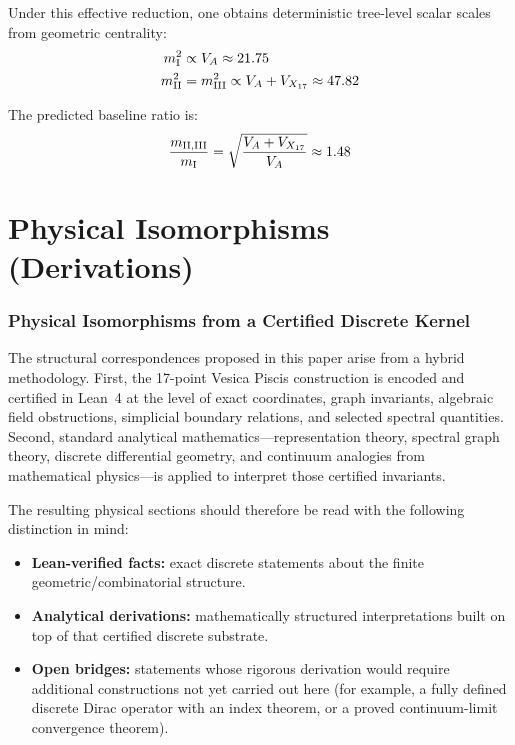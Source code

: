 \documentclass[12pt, a4paper]{article}
\begin{document}
Under this effective reduction, one obtains deterministic tree-level scalar scales from geometric centrality:
\begin{align*}
m_{\rm I}^2 &\propto V_A \approx 21.75 \\
m_{\rm II}^2 &= m_{\rm III}^2 \propto V_A + V_{X_{17}} \approx 47.82
\end{align*}

The predicted baseline ratio is:
\[
\frac{m_{\rm II, III}}{m_{\rm I}} = \sqrt{\frac{V_A + V_{X_{17}}}{V_A}} \approx 1.48
\]
\newpage
\part{Physical Isomorphisms (Derivations)}

\section{Physical Isomorphisms from a Certified Discrete Kernel}\label{sec:physics}

The structural correspondences proposed in this paper arise from a hybrid methodology. First, the 17-point Vesica Piscis construction is encoded and certified in Lean~4 at the level of exact coordinates, graph invariants, algebraic field obstructions, simplicial boundary relations, and selected spectral quantities. Second, standard analytical mathematics---representation theory, spectral graph theory, discrete differential geometry, and continuum analogies from mathematical physics---is applied to interpret those certified invariants.

The resulting physical sections should therefore be read with the following distinction in mind:

\begin{itemize}
    \item \textbf{Lean-verified facts:} exact discrete statements about the finite geometric/combinatorial structure.
    \item \textbf{Analytical derivations:} mathematically structured interpretations built on top of that certified discrete substrate.
    \item \textbf{Open bridges:} statements whose rigorous derivation would require additional constructions not yet carried out here (for example, a fully defined discrete Dirac operator with an index theorem, or a proved continuum-limit convergence theorem).
\end{itemize}
\end{document}
